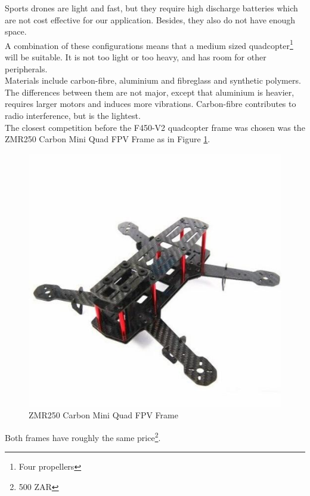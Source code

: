 Sports drones are light and fast, but they require high discharge batteries which are not cost effective for our application. Besides, they also do not have enough space.\\

A combination of these configurations means that a medium sized quadcopter\footnote{Four propellers} will be suitable. It is not too light or too heavy, and has room for other peripherals.\\

Materials include carbon-fibre, aluminium and fibreglass and synthetic polymers. The differences between them are not major, except that aluminium is heavier, requires larger motors and induces more vibrations. Carbon-fibre contributes to radio interference\cite{frame}, but is the lightest.\\

The closest competition before the F450-V2 quadcopter frame was chosen was the ZMR250 Carbon Mini Quad FPV Frame as in Figure \ref{fig:zmr}.

\begin{figure}[H]
\centering
\includegraphics[scale=0.35]{images/zmr250.jpeg}
\caption{ZMR250 Carbon Mini Quad FPV Frame \cite{frobot}}
\label{fig:zmr}
\end{figure}

Both frames have roughly the same price\footnote{500 ZAR}.\\

